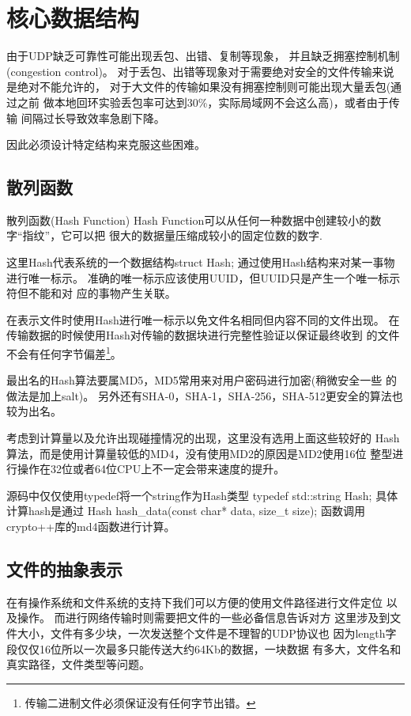 \chapter{核心数据结构}
由于UDP缺乏可靠性\cite{UDP}可能出现丢包、出错、复制等现象，
并且缺乏拥塞控制机制(congestion control)。
对于丢包、出错等现象对于需要绝对安全的文件传输来说是绝对不能允许的，
对于大文件的传输如果没有拥塞控制则可能出现大量丢包(通过之前
做本地回环实验丢包率可达到30\%，实际局域网不会这么高)，或者由于传输
间隔过长导致效率急剧下降。

因此必须设计特定结构来克服这些困难。


\section{散列函数}
散列函数(Hash Function)
Hash Function可以从任何一种数据中创建较小的数字``指纹''，它可以把
很大的数据量压缩成较小的固定位数的数字\cite{hash}.

这里Hash代表系统的一个数据结构struct Hash;
通过使用Hash结构来对某一事物进行唯一标示。
准确的唯一标示应该使用UUID，但UUID只是产生一个唯一标示符但不能和对
应的事物产生关联。

在表示文件时使用Hash进行唯一标示以免文件名相同但内容不同的文件出现。
在传输数据的时候使用Hash对传输的数据块进行完整性验证以保证最终收到
的文件不会有任何字节偏差\footnote{传输二进制文件必须保证没有任何字节出错。}。

最出名的Hash算法要属MD5，MD5常用来对用户密码进行加密(稍微安全一些
的做法是加上salt)。
另外还有SHA-0，SHA-1，SHA-256，SHA-512更安全的算法也较为出名。

考虑到计算量以及允许出现碰撞情况的出现，这里没有选用上面这些较好的
Hash算法，而是使用计算量较低的MD4，没有使用MD2的原因是MD2使用16位
整型进行操作在32位或者64位CPU上不一定会带来速度的提升。

源码中仅仅使用typedef将一个string作为Hash类型
typedef std::string Hash;
具体计算hash是通过
Hash hash\_data(const char* data, size\_t size);
函数调用\mbox{crypto++}库的md4函数进行计算。


\section{文件的抽象表示}
在有操作系统和文件系统的支持下我们可以方便的使用文件路径进行文件定位
以及操作。
而进行网络传输时则需要把文件的一些必备信息告诉对方
这里涉及到文件大小，文件有多少块，一次发送整个文件是不理智的UDP协议也
因为length字段仅仅16位\cite{UDP}所以一次最多只能传送大约64Kb的数据，一块数据
有多大，文件名和真实路径，文件类型等问题。

